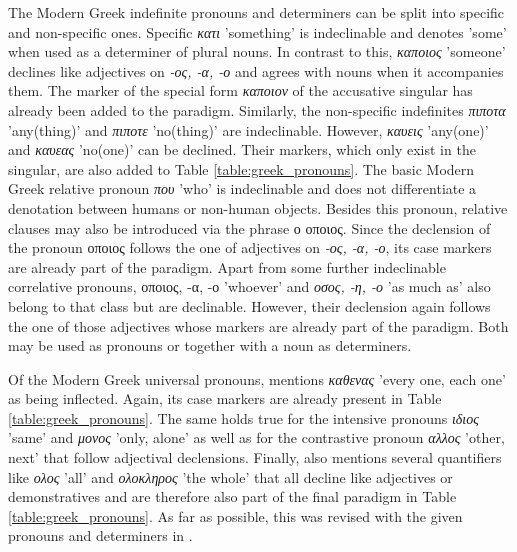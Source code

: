\documentclass[11pt,a4paper,twoside,openright]{scrbook}
\begin{document}
The Modern Greek indefinite pronouns and determiners can be split into specific and non-specific ones. Specific \foreignlanguage{greek}{\textit{κατι}} 'something' is indeclinable and denotes 'some' when used as a determiner of plural nouns. In contrast to this, \foreignlanguage{greek}{\textit{καποιος}} 'someone' declines like  adjectives on \foreignlanguage{greek}{\textit{-ος, -α, -ο}} and agrees with nouns when it accompanies them. The marker of the special form \foreignlanguage{greek}{\textit{καποιον}} of the accusative singular has already been added to the paradigm. Similarly, the non-specific indefinites \foreignlanguage{greek}{\textit{πιποτα}} 'any(thing)' and \foreignlanguage{greek}{\textit{πιποτε}} 'no(thing)' are indeclinable. However, \foreignlanguage{greek}{\textit{καυεις}} 'any(one)' and \foreignlanguage{greek}{\textit{καυεας }} 'no(one)' can be declined. Their markers, which only exist in the singular, are also added to Table \ref{table:greek_pronouns}. The basic Modern Greek relative pronoun \foreignlanguage{greek}{\textit{που}} 'who' is indeclinable and does not differentiate a denotation between humans or non-human objects. Besides this pronoun, relative clauses may also be introduced via the phrase \foreignlanguage{greek}{ο οποιος}. Since the declension of the pronoun \foreignlanguage{greek}{οποιος} follows the one of adjectives on \foreignlanguage{greek}{\textit{-ος, -α, -ο}}, its case markers are already part of the paradigm. Apart from some further indeclinable correlative pronouns, \foreignlanguage{greek}{οποιος, -α, -ο} 'whoever' and \foreignlanguage{greek}{\textit{οσος, -η, -ο}} 'as much as' also belong to that class but are declinable. However, their declension again follows the one of those adjectives whose markers are already part of the paradigm. Both may be used as pronouns or together with a noun as determiners. 

Of the Modern Greek universal pronouns, \citet{holton2016greek} mentions \foreignlanguage{greek}{\textit{καθενας }} 'every one, each one' as being inflected. Again, its case markers are already present in Table \ref{table:greek_pronouns}. The same holds true for the intensive pronouns \foreignlanguage{greek}{\textit{ιδιος}} 'same' and \foreignlanguage{greek}{\textit{μονος}} 'only, alone' as well as for the contrastive pronoun \foreignlanguage{greek}{\textit{αλλος}} 'other, next' that follow adjectival declensions. Finally, \citet{holton2016greek} also mentions several quantifiers like \foreignlanguage{greek}{\textit{ολος}} 'all' and \foreignlanguage{greek}{\textit{ολοκληρος}} 'the whole' that all decline like adjectives or demonstratives and are therefore also part of the final paradigm in Table \ref{table:greek_pronouns}. As far as possible, this was revised with the given pronouns and determiners in \citet{ruge2001greek}. 
\end{document}

